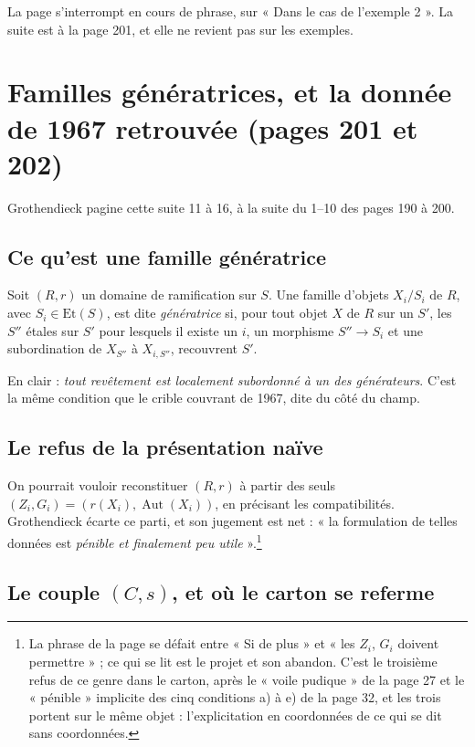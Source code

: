 \documentclass[11pt,a4paper]{article}
\begin{document}
La page s'interrompt en cours de phrase, sur « Dans le cas de l'exemple 2 ». La suite est à la page 201, et elle ne revient pas sur les exemples.

\section*{Familles génératrices, et la donnée de 1967 retrouvée (pages 201 et 202)}

Grothendieck pagine cette suite 11 à 16, à la suite du 1--10 des pages 190 à 200.

\subsection*{Ce qu'est une famille génératrice}

Soit $(R, r)$ un domaine de ramification sur $S$. Une famille d'objets
$X_{i}/S_{i}$ de $R$, avec $S_{i} \in \mathrm{Et}(S)$, est dite
\emph{génératrice} si, pour tout objet $X$ de $R$ sur un $S'$, les $S''$ étales
sur $S'$ pour lesquels il existe un $i$, un morphisme $S'' \to S_{i}$ et une
subordination de $X_{S''}$ à $X_{i,S''}$, recouvrent $S'$.

En clair : \emph{tout revêtement est localement subordonné à un des
générateurs}. C'est la même condition que le crible couvrant de 1967, dite du
côté du champ.

\subsection*{Le refus de la présentation naïve}

On pourrait vouloir reconstituer $(R, r)$ à partir des seuls
$(Z_{i}, G_{i}) = (r(X_{i}), \operatorname{Aut}(X_{i}))$, en précisant les
compatibilités. Grothendieck écarte ce parti, et son jugement est net : « la formulation de telles données est \emph{pénible et
finalement peu utile} ».\footnote{La phrase de la page se défait entre « Si de
plus » et « les $Z_{i}$, $G_{i}$ doivent permettre » ; ce qui se lit est le
projet et son abandon. C'est le troisième refus de ce genre dans le carton,
après le « voile pudique » de la page 27 et le « pénible » implicite des cinq
conditions a) à e) de la page 32, et les trois portent sur le même objet :
l'explicitation en coordonnées de ce qui se dit sans coordonnées.}

\subsection*{Le couple $(C, s)$, et où le carton se referme}
\end{document}
